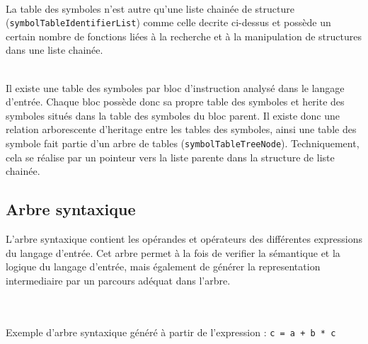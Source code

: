 ~~\\
La table des symboles n'est autre qu'une liste chainée de structure (\verb?symbolTableIdentifierList?) comme celle decrite ci-dessus et possède un certain nombre de fonctions liées à la recherche et à la manipulation de structures dans une liste chainée.

~~\\
Il existe une table des symboles par bloc d'instruction analysé dans le langage d'entrée. Chaque bloc possède donc sa propre table des symboles et herite des symboles situés dans la table des symboles du bloc parent. Il existe donc une relation arborescente d'heritage entre les tables des symboles, ainsi une table des symbole fait partie d'un arbre de tables (\verb?symbolTableTreeNode?). Techniquement, cela se réalise par un pointeur vers la liste parente dans la structure de liste chainée.

\subsection{Arbre syntaxique}

L'arbre syntaxique contient les opérandes et opérateurs des différentes expressions du langage d'entrée. Cet arbre permet à la fois de verifier la sémantique et la logique du langage d'entrée, mais également de générer la representation intermediaire par un parcours adéquat dans l'arbre.

~~\\
~~\\
Exemple d'arbre syntaxique généré à partir de l'expression : \verb?c = a + b * c?
\begin{center}
\end{center}
